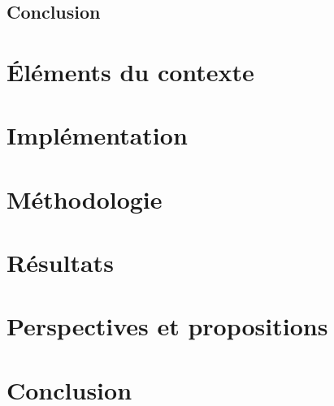 \documentclass[11pt,a4paper,oneside]{report}
\begin{document}
	\section{Conclusion}
	

\chapter{Éléments du contexte}
	
	
\chapter{Implémentation}
		
	
\chapter{Méthodologie}
	
	
\chapter{Résultats}
		

\chapter{Perspectives et propositions}
	

\chapter*{Conclusion}	
		
	
	
	
	
\end{document}

